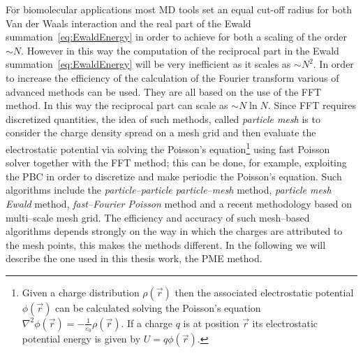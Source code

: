 For biomolecular applications most \ac{MD} tools set an equal cut-off radius for both Van der Waals interaction and the real part of the Ewald summation~\eqref{eq:EwaldEnergy} in order to achieve for both a scaling of the order $\sim N$. However in this way the computation of the reciprocal part in the Ewald summation~\eqref{eq:EwaldEnergy} will be very inefficient as it scales as $\sim N^2$. In order to increase the efficiency of the calculation of the Fourier transform various of advanced methods can be used. They are all based on the use of the \ac{FFT} method. In this way the reciprocal part can scale as $\sim N\ln N$. Since \ac{FFT} requires discretized quantities, the idea of such methods, called \textit{particle mesh} is to consider the charge density spread on a mesh grid and then evaluate the electrostatic potential via solving the Poisson's equation\footnote{Given a charge distribution $\rho(\vec r)$ then the associated electrostatic potential $\phi(\vec r)$ can be calculated solving the Poisson's equation $\displaystyle \nabla^2\phi(\vec r) = -\frac{1}{\varepsilon_0} \rho(\vec r)$. If a charge $q$ is at position $\vec r$ its electrostatic potential energy is given by $U = q\phi(\vec r)$.} using fast Poisson solver together with the \ac{FFT} method; this can be done, for example, exploiting the \ac{PBC} in order to discretize and make periodic the Poisson's equation.
Such algorithms include the \textit{particle--particle particle--mesh} method, \textit{particle mesh Ewald} 
method, \textit{fast--Fourier Poisson} method and a recent methodology based on multi--scale mesh grid. The 
efficiency and accuracy of such mesh--based algorithms depends strongly on the way in which the charges are 
attributed to the mesh points, this makes the methods different. In the following we will describe the one used 
in this thesis work, the \acf{PME} method.

